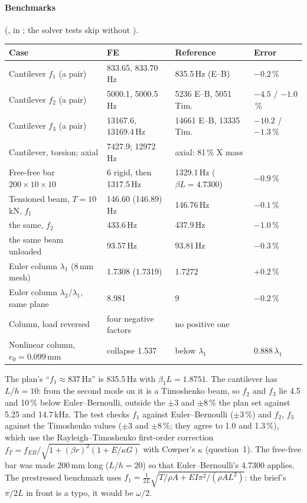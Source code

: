 \paragraph{Benchmarks} (, in ; the solver tests skip without ).
\begin{center}
\small\setlength{\tabcolsep}{4pt}
\begin{tabular}{@{}llll@{}}
\toprule
Case & FE & Reference & Error\\
\midrule
Cantilever $f_1$ (a pair) & 833.65, 833.70\,Hz & 835.5\,Hz (E--B) & $-0.2$\,\%\\
Cantilever $f_2$ (a pair) & 5000.1, 5000.5\,Hz & 5236 E--B, 5051 Tim. & $-4.5$ / $-1.0$\,\%\\
Cantilever $f_3$ (a pair) & 13167.6, 13169.4\,Hz & 14661 E--B, 13335 Tim. & $-10.2$ / $-1.3$\,\%\\
Cantilever, torsion; axial & 7427.9; 12972\,Hz & axial: 81\,\% X mass & \\
Free-free bar $200\times10\times10$ & 6 rigid, then 1317.5\,Hz & 1329.1\,Hz ($\beta L=4.7300$) & $-0.9$\,\%\\
Tensioned beam, $T=10$\,kN, $f_1$ & 146.60 (146.89)\,Hz & 146.76\,Hz & $-0.1$\,\%\\
\quad the same, $f_2$ & 433.6\,Hz & 437.9\,Hz & $-1.0$\,\%\\
\quad the same beam unloaded & 93.57\,Hz & 93.81\,Hz & $-0.3$\,\%\\
Euler column $\lambda_1$ (8\,mm mesh) & 1.7308 (1.7319) & 1.7272 & $+0.2$\,\%\\
Euler column $\lambda_2/\lambda_1$, same plane & 8.981 & 9 & $-0.2$\,\%\\
Column, load reversed & four negative factors & no positive one & \\
Nonlinear column, $e_0=0.099$\,mm & collapse 1.537 & below $\lambda_1$ & $0.888\,\lambda_1$\\
\bottomrule
\end{tabular}
\end{center}
The plan's ``$f_1\approx837$\,Hz'' is 835.5\,Hz with $\beta_1L=1.8751$. The cantilever has $L/h=10$: from the second mode on it is a Timoshenko beam, so $f_2$ and $f_3$ lie 4.5 and
10\,\% below Euler--Bernoulli, outside the $\pm3$ and $\pm8$\,\% the plan set against 5.25 and 14.7\,kHz. The test
checks $f_1$ against Euler--Bernoulli ($\pm3$\,\%) and $f_2$, $f_3$ against the Timoshenko values ($\pm3$ and
$\pm8$\,\%; they agree to 1.0 and 1.3\,\%), which use the Rayleigh--Timoshenko first-order correction
$f_T=f_{EB}/\sqrt{1+(\beta r)^2(1+E/\kappa G)}$ with Cowper's $\kappa$ (question~1). The free-free bar was made
200\,mm long ($L/h=20$) so that Euler--Bernoulli's 4.7300 applies. The prestressed benchmark uses
$f_1=\frac{1}{2L}\sqrt{T/\rho A+EI\pi^2/(\rho AL^2)}$: the brief's $\pi/2L$ in front is a typo, it would be
$\omega/2$.

